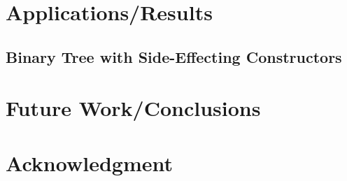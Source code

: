 \documentclass[conference]{IEEEtran}
\begin{document}
\section{Applications/Results}

\subsection{Binary Tree with Side-Effecting Constructors}

\section{Future Work/Conclusions}

\section*{Acknowledgment}

%
%

\end{document}
